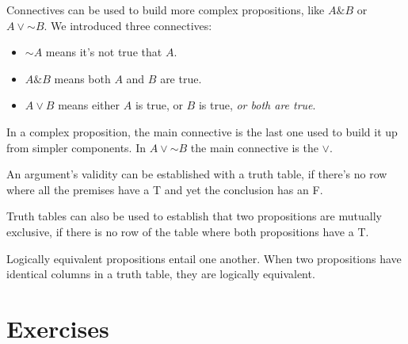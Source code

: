 \documentclass[justified]{tufte-book}
\providecommand{\tightlist}{%
  \setlength{\itemsep}{0pt}\setlength{\parskip}{0pt}}
\renewcommand{\neg}{\mathbin{\sim}}
\renewcommand{\wedge}{\mathbin{\&}}
\theoremstyle{definition}
\theoremstyle{definition}
\theoremstyle{definition}
\theoremstyle{definition}
\theoremstyle{remark}
\begin{document}
Connectives can be used to build more complex propositions, like \(A \wedge B\) or \(A \vee \neg B\). We introduced three connectives:

\begin{itemize}
\tightlist
\item
  \(\neg A\) means it's not true that \(A\).
\item
  \(A \wedge B\) means both \(A\) and \(B\) are true.
\item
  \(A \vee B\) means either \(A\) is true, or \(B\) is true, \emph{or both are true}.
\end{itemize}

In a complex proposition, the main connective is the last one used to build it up from simpler components. In \(A \vee \neg B\) the main connective is the \(\vee\).

An argument's validity can be established with a truth table, if there's no row where all the premises have a T and yet the conclusion has an F.

Truth tables can also be used to establish that two propositions are mutually exclusive, if there is no row of the table where both propositions have a T.

Logically equivalent propositions entail one another. When two propositions have identical columns in a truth table, they are logically equivalent.

\hypertarget{exercises-2}{%
\section*{Exercises}\label{exercises-2}}
\end{document}
